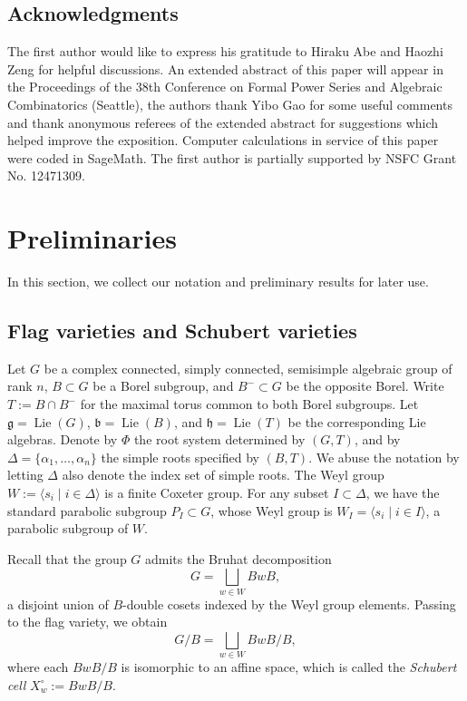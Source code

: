 \documentclass[11pt, letterpaper]{amsart}
\numberwithin{equation}{section}
\DeclareMathOperator{\Lie}{Lie}
\begin{document}
\subsection*{Acknowledgments}
The first author would like to express his gratitude to Hiraku Abe and Haozhi Zeng for helpful discussions. 
An extended abstract of this paper will appear in the Proceedings of the 38th Conference on Formal Power Series and Algebraic Combinatorics (Seattle), the authors thank Yibo Gao for some useful comments and thank anonymous referees of the extended abstract for suggestions which helped improve the exposition. Computer calculations in service of this paper were coded in SageMath. 
The first author is partially supported by NSFC Grant No. 12471309.

\section{Preliminaries} \label{sec-preli}

In this section, we collect our notation and preliminary results for later use. 

\subsection{Flag varieties and Schubert varieties} \label{sec-pre-flag}
Let $G$ be a complex connected, simply connected, semisimple algebraic group of rank $n$, $B\subset G$ be a Borel subgroup, and $B^{-}\subset G$ be the opposite Borel.  Write $T:=B \cap B^{-}$ for the maximal torus common to both Borel subgroups. Let $\mathfrak{g}=\Lie(G)$, $\mathfrak{b}=\Lie(B)$, and $\mathfrak{h}=\Lie(T)$ be the corresponding Lie algebras. Denote by $\Phi$ the root system determined by $(G,T)$, and by
$\Delta=\{\alpha_{1},\dots,\alpha_{n}\}$ the simple roots specified by $(B,T)$. We abuse the notation by letting $\Delta$ also denote the index set of simple roots. The Weyl group $W:=\langle s_{i}\mid i\in\Delta\rangle$ is a finite Coxeter group. For any subset $I\subset\Delta$, we have the standard parabolic subgroup $P_{I}\subset G$,
whose Weyl group is $W_{I}= \langle s_{i}\mid i\in I\rangle$, a parabolic subgroup of $W$.

Recall that the group \(G\) admits the Bruhat decomposition
\[
G=\bigsqcup_{w\in W} BwB,
\]
a disjoint union of \(B\)-double cosets indexed by the Weyl group elements. 
Passing to the flag variety, we obtain
\begin{equation} \label{eq-Bruhat}
    G/B=\bigsqcup_{w\in W} BwB/B,
\end{equation}
where each \(BwB/B\) is isomorphic to an affine space, which is called the \emph{Schubert cell} \(X^{\circ}_{w}:=BwB/B\).
\end{document}
